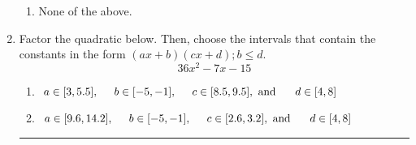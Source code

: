 \documentclass[14pt]{extbook}
\newcommand{\litem}[1]{\item#1\hspace*{-1cm}\rule{\textwidth}{0.4pt}}
\begin{document}
\begin{enumerate}
{\begin{enumerate}[label=\Alph*.]
\item None of the above.
\end{enumerate} }
\litem{
Factor the quadratic below. Then, choose the intervals that contain the constants in the form $(ax+b)(cx+d); b \leq d.$\[ 36x^{2} -7 x -15 \]\begin{enumerate}[label=\Alph*.]
\item \( a \in [3, 5.5], \hspace*{5mm} b \in [-5, -1], \hspace*{5mm} c \in [8.5, 9.5], \text{ and } \hspace*{5mm} d \in [4, 8] \)
\item \( a \in [9.6, 14.2], \hspace*{5mm} b \in [-5, -1], \hspace*{5mm} c \in [2.6, 3.2], \text{ and } \hspace*{5mm} d \in [4, 8] \)

\end{enumerate}}
\end{enumerate}
\end{document}
